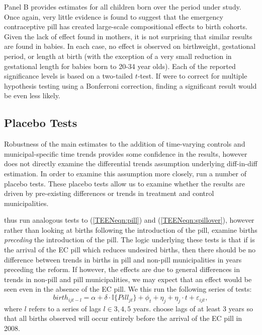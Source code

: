 Panel B provides estimates for all children born over the period under study.
Once again, very little evidence is found to suggest that the emergency 
contraceptive pill has created large-scale compositional effects to birth
cohorts.  Given the lack of effect found in mothers, it is not surprising
that similar results are found in babies.  In each case, no effect is observed
on birthweight, gestational period, or length at birth (with the exception
of a very small reduction in gestational length for babies born to 20-34 year
olds).  Each of the reported significance levels is based on a two-tailed 
$t$-test.  If \person were to correct for multiple hypothesis testing using a
Bonferroni correction, finding a significant result would be even less likely.

\subsection{Placebo Tests}
\label{TEENsscn:placebo}
Robustness of the main estimates to the addition of time-varying controls and
municipal-specific time trends provides some confidence in the results, however 
does not directly examine the differential trends assumption underlying 
diff-in-diff estimation.  In order to examine this assumption more closely, 
\person run a number of placebo tests.  These placebo tests allow us to examine
whether the results are driven by pre-existing differences or trends in treatment
and control municipalities. 

\Person thus run analogous tests to (\ref{TEENeqn:pill}) and 
(\ref{TEENeqn:spillover}), however rather than looking at births following the
introduction of the pill, \person examine births \emph{preceding} the introduction
of the pill.  The logic underlying these tests is that if is the arrival of the EC 
pill which reduces undesired births, then there should be no difference between 
trends in births in pill and non-pill municipalities in years preceding the reform.  
If however, the effects are due to general differences in trends in non-pill and 
pill municipalities, we may expect that an effect would be seen even in the 
absence of the EC pill.  We this run the following series of tests:
\begin{equation}
 \label{TEENeqn:placebo}
birth_{ijt-l} = \alpha + \delta\cdot \mathbb{I}\{Pill_{jt}\} + \phi_t + \eta_j + 
\eta_j\cdot t + \varepsilon_{ijt},
\end{equation}
where $l$ refers to a series of lags $l\in 3,4,5$ years.  \Person choose lags of
at least 3 years so that all births observed will occur entirely before the 
arrival of the EC pill in 2008.


